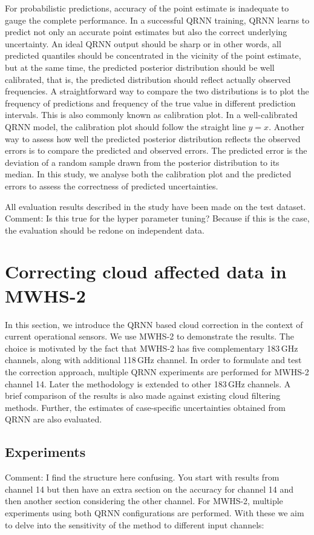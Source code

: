 \documentclass[amt, manuscript]{copernicus}
\newcommand{\todo}[1]{{\color{red} #1}}
\begin{document}
For probabilistic predictions, accuracy of the point estimate is inadequate to
gauge the complete performance. In a successful QRNN training, QRNN learns to
predict not only an accurate point estimates but also the correct underlying
uncertainty. An ideal QRNN output should be sharp or in other words, all
predicted quantiles should be concentrated in the vicinity of the point
estimate, but at the same time, the predicted posterior distribution should be
well calibrated, that is, the predicted distribution should reflect actually
observed frequencies. A straightforward way to compare the two distributions is
to plot the frequency of predictions and frequency of the true value in
different prediction intervals. This is also commonly known as calibration plot.
In a well-calibrated QRNN model, the calibration plot should follow the straight
line $y = x$. Another way to assess how well the predicted posterior distribution
reflects the observed errors is to compare the predicted and observed errors.
The predicted error is the deviation of a random sample drawn from the posterior
distribution to its median. In this study, we analyse both the calibration plot
and the predicted errors to assess the correctness of predicted uncertainties.

All evaluation results described in the study have been made on the test dataset.
\todo{Comment: Is this true for the hyper parameter tuning? Because if this is the
  case, the evaluation should be redone on independent data.}


\section{Correcting cloud affected data in MWHS-2}
\label{qrnn_mwhs}
%
In this section, we introduce the QRNN based cloud correction in the context of current operational sensors.  We use MWHS-2 to demonstrate the results. The choice is motivated by the fact that MWHS-2 has five complementary 183\,GHz channels, along with additional 118\,GHz channel. In order to formulate and test the correction approach, multiple QRNN experiments are performed for MWHS-2 channel 14. Later the methodology is extended to other 183\,GHz channels. A brief comparison of the results is also made against existing cloud filtering methods. Further, the estimates of case-specific uncertainties obtained from QRNN are also evaluated.

\subsection{Experiments}
\todo{Comment: I find the structure here confusing. You start with results from channel 14 but then have
  an extra section on the accuracy for channel 14 and then another section considering the other
  channel.}
%
\label{sec:QRNN_expt_MWHS}
For MWHS-2, multiple experiments using both QRNN configurations are performed. With these we aim to delve into the sensitivity of the method to different input channels:
\end{document}
